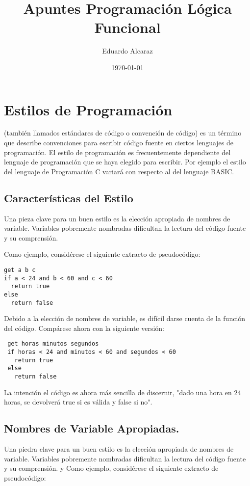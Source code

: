 \documentclass[11pt]{article}
\author{Eduardo Alcaraz}
\date{\today}
\title{Apuntes Programación Lógica Funcional}
\begin{document}
\maketitle
\tableofcontents


\section*{Estilos de Programación}
\label{sec:orgfa7c346}

(también llamados estándares de código o convención de código) es un
término que describe convenciones para escribir código fuente en
ciertos lenguajes de programación. El estilo de programación es
frecuentemente dependiente del lenguaje de programación que se haya
elegido para escribir. Por ejemplo el estilo del lenguaje de
Programación C variará con respecto al del lenguaje BASIC.


\subsection*{Características del Estilo}
\label{sec:org3aee4de}

Una pieza clave para un buen estilo es la elección apropiada de
nombres de variable. Variables pobremente nombradas dificultan la
lectura del código fuente y su comprensión.

Como ejemplo, considérese el siguiente extracto de pseudocódigo:

\begin{verbatim}
get a b c 
if a < 24 and b < 60 and c < 60
  return true
else
  return false
\end{verbatim}

Debido a la elección de nombres de variable, es difícil darse cuenta
de la función del código. Compárese ahora con la siguiente versión:


\begin{verbatim}
 get horas minutos segundos 
 if horas < 24 and minutos < 60 and segundos < 60
   return true
 else
   return false
\end{verbatim}

La intención el código es ahora más sencilla de discernir, "dado una
hora en 24 horas, se devolverá true si es válida y false si no".


\subsection*{Nombres de Variable Apropiadas.}
\label{sec:orgb39e578}
Una piedra clave para un buen estilo es la elección apropiada de
nombres de variable. Variables pobremente nombradas dificultan la
lectura del código fuente y su comprensión.  y Como ejemplo,
considérese el siguiente extracto de pseudocódigo:
\end{document}
